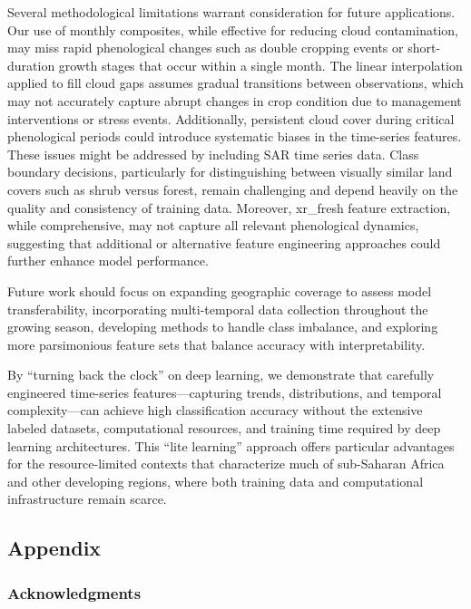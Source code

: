 \documentclass[
  journal,
  twocolumn]{IEEEtran}
\begin{document}
Several methodological limitations warrant consideration for future
applications. Our use of monthly composites, while effective for
reducing cloud contamination, may miss rapid phenological changes such
as double cropping events or short-duration growth stages that occur
within a single month. The linear interpolation applied to fill cloud
gaps assumes gradual transitions between observations, which may not
accurately capture abrupt changes in crop condition due to management
interventions or stress events. Additionally, persistent cloud cover
during critical phenological periods could introduce systematic biases
in the time-series features. These issues might be addressed by
including SAR time series data. Class boundary decisions, particularly
for distinguishing between visually similar land covers such as shrub
versus forest, remain challenging and depend heavily on the quality and
consistency of training data. Moreover, xr\_fresh feature extraction,
while comprehensive, may not capture all relevant phenological dynamics,
suggesting that additional or alternative feature engineering approaches
could further enhance model performance.

Future work should focus on expanding geographic coverage to assess
model transferability, incorporating multi-temporal data collection
throughout the growing season, developing methods to handle class
imbalance, and exploring more parsimonious feature sets that balance
accuracy with interpretability.

By ``turning back the clock'' on deep learning, we demonstrate that
carefully engineered time-series features---capturing trends,
distributions, and temporal complexity---can achieve high classification
accuracy without the extensive labeled datasets, computational
resources, and training time required by deep learning architectures.
This ``lite learning'' approach offers particular advantages for the
resource-limited contexts that characterize much of sub-Saharan Africa
and other developing regions, where both training data and computational
infrastructure remain scarce.

\newpage

\subsection{Appendix}\label{appendix}

\subsubsection{Acknowledgments}\label{acknowledgments}
\end{document}
